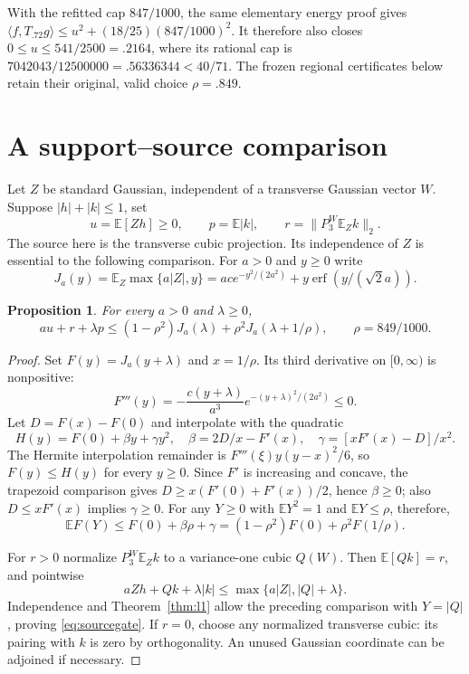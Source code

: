 \documentclass[11pt]{article}
\newcommand{\E}{\mathbb E}
\newtheorem{proposition}[theorem]{Proposition}
\begin{document}
With the refitted cap $847/1000$, the same elementary energy proof gives
$\langle f,T_{.72}g\rangle\le u^2+(18/25)(847/1000)^2$.
It therefore also closes $0\le u\le541/2500=.2164$, where its
rational cap is $7042043/12500000=.56336344<40/71$.
The frozen regional certificates below retain their original, valid
choice $\rho=.849$.

\section{A support--source comparison}\label{sec:source}
Let $Z$ be standard Gaussian, independent of a transverse Gaussian
vector $W$. Suppose $|h|+|k|\le1$, set
\[
 u=\E[Zh]\ge0,\qquad p=\E|k|,\qquad
 r=\|P_3^W\E_Z k\|_2.
\]
The source here is the transverse cubic projection. Its independence
of $Z$ is essential to the following comparison.
For $a>0$ and $y\ge0$ write
\[
 J_a(y)=\E_Z\max\{a|Z|,y\}
 =ac e^{-y^2/(2a^2)}+y\operatorname{erf}(y/(\sqrt2a)).
\]
\begin{proposition}\label{prop:source}
For every $a>0$ and $\lambda\ge0$,
\begin{equation}\label{eq:sourcegate}
 au+r+\lambda p\le
 (1-\rho^2)J_a(\lambda)+\rho^2J_a(\lambda+1/\rho),
 \qquad \rho=849/1000.
\end{equation}
\end{proposition}
\begin{proof}
Set $F(y)=J_a(y+\lambda)$ and $x=1/\rho$.
Its third derivative on $[0,\infty)$ is nonpositive:
\[
 F'''(y)=-\frac{c(y+\lambda)}{a^3}e^{-(y+\lambda)^2/(2a^2)}\le0.
\]
Let $D=F(x)-F(0)$ and interpolate with the quadratic
\[
 H(y)=F(0)+\beta y+\gamma y^2,\quad
 \beta=2D/x-F'(x),\quad \gamma=[xF'(x)-D]/x^2.
\]
The Hermite interpolation remainder is
$F'''(\xi)y(y-x)^2/6$, so $F(y)\le H(y)$ for every $y\ge0$.
Since $F'$ is increasing and concave, the trapezoid comparison gives
$D\ge x(F'(0)+F'(x))/2$, hence $\beta\ge0$; also
$D\le xF'(x)$ implies $\gamma\ge0$.
For any $Y\ge0$ with $\E Y^2=1$ and $\E Y\le\rho$, therefore,
\[
 \E F(Y)\le F(0)+\beta\rho+\gamma
 =(1-\rho^2)F(0)+\rho^2F(1/\rho).
\]

For $r>0$ normalize $P_3^W\E_Z k$ to a variance-one cubic $Q(W)$.
Then $\E[Qk]=r$, and pointwise
\[
 aZh+Qk+\lambda|k|\le\max\{a|Z|,|Q|+\lambda\}.
\]
Independence and Theorem~\ref{thm:l1} allow the preceding comparison
with $Y=|Q|$, proving \eqref{eq:sourcegate}. If $r=0$, choose any
normalized transverse cubic: its pairing with $k$ is zero by orthogonality.
An unused Gaussian coordinate can be adjoined if necessary.
\end{proof}
\end{document}
